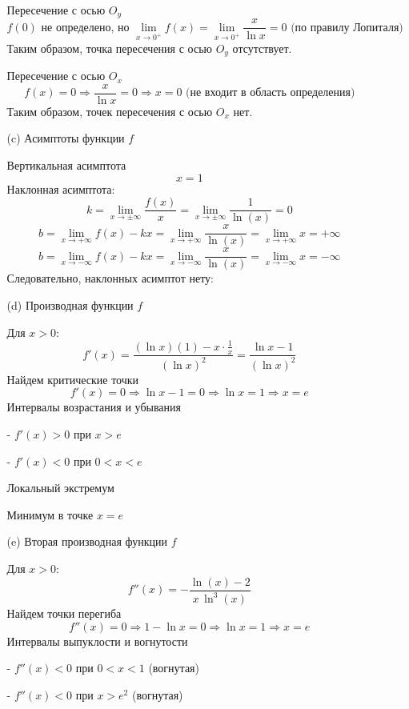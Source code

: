 \documentclass[a4paper]{article}
\renewcommand{\f}[2]{\frac{#1}{#2}}
\begin{document}
\begin{enumerate}
\begin{enumerate}
        Пересечение с осью $ O_y $
        $$
        f(0) \text{ не определено, но } \lim_{x \to 0^+} f(x) = \lim_{x \to 0^+} \frac{x}{\ln x} = 0 \text{ (по правилу Лопиталя)}
        $$
        Таким образом, точка пересечения с осью $ O_y $ отсутствует.

        Пересечение с осью $ O_x $
        $$
        f(x) = 0 \Rightarrow \frac{x}{\ln x} = 0 \Rightarrow x = 0 \text{ (не входит в область определения)}
        $$
        Таким образом, точек пересечения с осью $ O_x $ нет.

        \item[(c)]Асимптоты функции $ f $
        
        Вертикальная асимптота
        $$x = 1$$
        Наклонная асимптота:
        $$k = \lim_{x \to \pm \infty}{\f{f(x)}{x}} = \lim_{x \to \pm \infty}\f{1}{\ln(x)} = 0$$
        $$b = \lim_{x \to +\infty}{f(x)-kx} =  \lim_{x \to +\infty} \frac{x}{\ln(x)} = \lim_{x \to +\infty} x =+\infty$$
        $$b = \lim_{x \to -\infty}{f(x)-kx} =  \lim_{x \to -\infty} \frac{x}{\ln(x)} = \lim_{x \to -\infty} x =-\infty$$
        Следовательно, наклонных асимптот нету:

        \item[(d)]Производная функции $ f $
        
        Для $ x > 0 $:
        $$
        f'(x) = \frac{(\ln x)(1) - x \cdot \frac{1}{x}}{(\ln x)^2} = \frac{\ln x - 1}{(\ln x)^2}
        $$
        Найдем критические точки
        $$
        f'(x) = 0 \Rightarrow \ln x - 1 = 0 \Rightarrow \ln x = 1 \Rightarrow x = e
        $$
        Интервалы возрастания и убывания

        - $ f'(x) > 0 $ при $ x > e $

        - $ f'(x) < 0 $ при $ 0 < x < e $

        Локальный экстремум

        Минимум в точке $ x = e $

        \item[(e)]Вторая производная функции $ f $
        
        Для $ x > 0 $:
        $$
        f''(x) = -\frac{\ln\left(x\right)-2}{x\,\ln^{3}\left(x\right)}
        $$
        Найдем точки перегиба
        $$
        f''(x) = 0 \Rightarrow 1 - \ln x = 0 \Rightarrow \ln x = 1 \Rightarrow x = e
        $$
        Интервалы выпуклости и вогнутости

        - $ f''(x) < 0 $ при $ 0<x < 1 $ (вогнутая)

        - $ f''(x) < 0 $ при $ x>e^2 $ (вогнутая)


\end{enumerate}
\end{enumerate}
\end{document}
